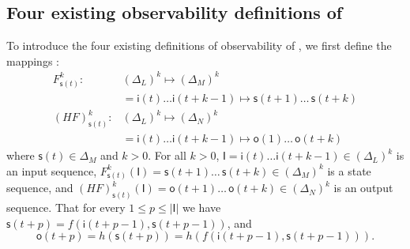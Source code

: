 %  

\subsection{Four existing observability definitions of \BCNs}
To introduce the four existing definitions of observability of \BCNs, we first define the mappings \cite{Zhang2016Observability}:
\begin{equation}
\begin{split}
F^k_{\mathsf{s}(t)}:& (\Delta_L)^k\mapsto(\Delta_M)^k\\
&=\mathsf{i}(t)\ldots \mathsf{i}({t+k-1}) \mapsto \mathsf{s}(t+1) \ldots\, \mathsf{s}(t+k)\\
(HF)^k_{\mathsf{s}(t)} :& (\Delta_L)^k\mapsto(\Delta_N)^k\\
 &=\mathsf{i}(t)\ldots \mathsf{i}(t+k-1) \mapsto \mathsf{o}(1)\ldots\, \mathsf{o}(t+k)
\end{split}
\label{equ:6}
\end{equation}
where $\mathsf{s}(t)\in \Delta_M$ and $k>0$. For all  $k>0$,
$\mathsf{I}=\mathsf{i}(t)\ldots \mathsf{i}({t+k-1}) \in(\Delta_L)^k$
is an input sequence, 
$F^k_{\mathsf{s}(t)}(\mathsf{I})=\mathsf{s}(t+1) \ldots\, \mathsf{s}(t+k) \in(\Delta_M)^k$
 is a state sequence, and 
 $(HF)^k_{\mathsf{s}(t)}(\mathsf{I})=\mathsf{o}(t+1)\ldots\, \mathsf{o}(t+k) \in(\Delta_N)^k$
 is an output sequence. That for every $1\le p \le |\mathsf{I}|$ we have 
 $\mathsf{s}(t+p)=f(\mathsf{i}(t+p-1),\mathsf{s}(t+p-1))$,
and 
 \[\mathsf{o}(t+p)=h(\mathsf{s}(t+p))=h(f(\mathsf{i}(t+p-1),\mathsf{s}(t+p-1))).\] 

